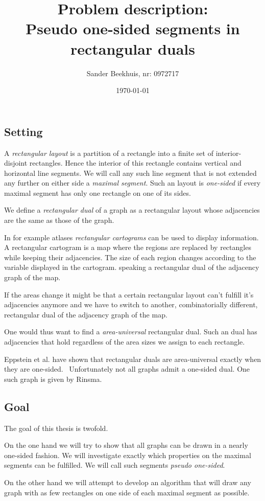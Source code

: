 \documentclass[a4paper]{article}
\title{Problem description:\\ Pseudo one-sided segments in rectangular duals}
\author{Sander Beekhuis, nr: 0972717}
\date{\today} %
\begin{document}
\maketitle

\subsection*{Setting}
A  \emph{rectangular layout} is a partition of a rectangle into a finite set of interior-disjoint rectangles. Hence the interior of this rectangle contains vertical and horizontal line segments. We will call any such line segment that is not extended any further on either side a \emph{maximal segment}. Such an layout is \emph{one-sided} if every maximal segment has only one rectangle on one of its sides.

We define a \emph{rectangular dual} of a graph as a rectangular layout whose adjacencies are the same as those of the graph.

In for example atlases \emph{rectangular cartograms} can be used to display information. A rectangular cartogram is a map where the regions are replaced by rectangles while keeping their adjacencies. The size of each region changes according to the variable displayed in the cartogram.   speaking a rectangular dual of the adjacency graph of the map.

If the areas change it might be that a certain rectangular layout can't fulfill it's adjacencies anymore and we have to switch to another, combinatorially different, rectangular dual of the adjacency graph of the map.

One would thus want to find a \emph{area-universal} rectangular dual. Such an dual has adjacencies that hold regardless of the area sizes we assign to  each rectangle.


Eppstein et al. have shown that rectangular duals are area-universal exactly when they are one-sided.~\cite{Eppstein2012} Unfortunately not all graphs admit a one-sided dual. One such graph is given by Rinsma.~\cite{Rinsma1987}

\subsection*{Goal}
The goal of this thesis is twofold.

On the one hand we will try to show that all graphs can be drawn in a nearly one-sided fashion. We will investigate exactly which properties on the {maximal segments} can be fulfilled. We will call such segments \emph{pseudo one-sided}.

On the other hand we will attempt to develop an algorithm that will draw any graph with as few rectangles on one side of each {maximal segment} as possible.

\printbibliography
\end{document}
